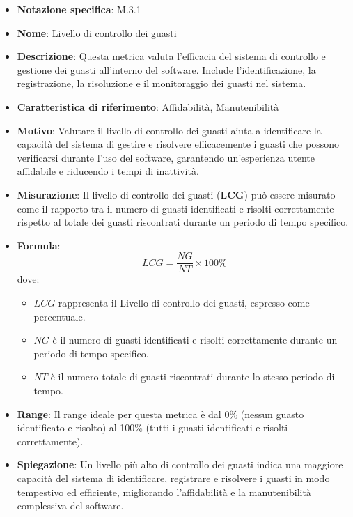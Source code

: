 \begin{itemize}
    \item \textbf{Notazione specifica}: M.3.1
    \item \textbf{Nome}: Livello di controllo dei guasti
    \item \textbf{Descrizione}: Questa metrica valuta l'efficacia del sistema di controllo e gestione dei guasti all'interno del software. Include l'identificazione, la registrazione, la risoluzione e il monitoraggio dei guasti nel sistema.
    \item \textbf{Caratteristica di riferimento}: Affidabilità, Manutenibilità
    \item \textbf{Motivo}: Valutare il livello di controllo dei guasti aiuta a identificare la capacità del sistema di gestire e risolvere efficacemente i guasti che possono verificarsi durante l'uso del software, garantendo un'esperienza utente affidabile e riducendo i tempi di inattività.
    \item \textbf{Misurazione}: Il livello di controllo dei guasti (\textbf{LCG}) può essere misurato come il rapporto tra il numero di guasti identificati e risolti correttamente rispetto al totale dei guasti riscontrati durante un periodo di tempo specifico.
    \item \textbf{Formula}:
    \[ LCG = \frac{NG}{NT} \times 100\% \]
    dove:
    \begin{itemize}
        \item \( LCG \) rappresenta il Livello di controllo dei guasti, espresso come percentuale.
        \item \( NG \) è il numero di guasti identificati e risolti correttamente durante un periodo di tempo specifico.
        \item \( NT \) è il numero totale di guasti riscontrati durante lo stesso periodo di tempo.
    \end{itemize}
    \item \textbf{Range}: Il range ideale per questa metrica è dal 0\% (nessun guasto identificato e risolto) al 100\% (tutti i guasti identificati e risolti correttamente).
    \item \textbf{Spiegazione}: Un livello più alto di controllo dei guasti indica una maggiore capacità del sistema di identificare, registrare e risolvere i guasti in modo tempestivo ed efficiente, migliorando l'affidabilità e la manutenibilità complessiva del software.
\end{itemize}
